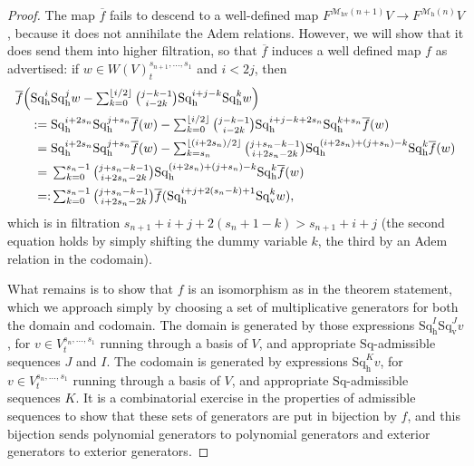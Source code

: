 \documentclass[11pt]{amsart} \renewcommand{\baselinestretch}{1.2}
\theoremstyle{plain}
\theoremstyle{definition}
\renewcommand{\to}{\longrightarrow}
\newcommand{\calMh}{\mathcal{M}\dhor}
\newcommand{\calMhv}{\mathcal{M}_\mathrm{hv}}
\newcommand{\Sq}{\mathrm{Sq}}
\newcommand{\dver}{_\mathrm{v}}
\newcommand{\dhor}{_\mathrm{h}}
\newcommand{\Sqh}{\mathrm{Sq}\dhor}
\newcommand{\Sqv}{\mathrm{Sq}\dver}
\begin{document}
\begin{Cohomology Operations for W and U}
\begin{proof}
The map $\overline{f}$ fails to descend to a well-defined map  $F^{\calMhv(n+1)}V\to F^{\calMh(n)}V$, because it does not annihilate the Adem relations. However, we will show that it does send them into higher filtration, so that $\overline{f}$ induces a well defined map $f$ as advertised: if $w\in W(V)^{s_{n+1},\ldots,s_1}_t$ and $i<2j$, then
\begin{alignat*}{2}
\overline{f}\Bigl(\Sqh^i&\Sqh^jw-\textstyle\sum_{k=0}^{\lfloor i/2\rfloor}{j-k-1\choose i-2k}\Sqh^{i+j-k}\Sqh^{k}w\Bigr)\\
{}:={}&\Sqh^{i+2s_n}\Sqh^{j+s_n}\overline{f}(w)-\textstyle\sum_{k=0}^{\lfloor i/2\rfloor}{j-k-1\choose i-2k}\Sqh^{i+j-k+2s_n}\Sqh^{k+s_n}\overline{f}(w)\\
{}={}&
\Sqh^{i+2s_n}\Sqh^{j+s_n}\overline{f}(w)-\textstyle\sum_{k=s_n}^{\lfloor (i+2s_n)/2\rfloor}{j+s_n-k-1\choose i+2s_n-2k}\Sqh^{(i+2s_n)+(j+s_n)-k}\Sqh^{k}\overline{f}(w)\\
{}={}&\textstyle\sum_{k=0}^{s_n-1}{j+s_n-k-1\choose i+2s_n-2k}\Sqh^{(i+2s_n)+(j+s_n)-k}\Sqh^{k}\overline{f}(w)\\
{}=\makebox[0cm][r]{$:$}{}&\textstyle\sum_{k=0}^{s_n-1}{j+s_n-k-1\choose i+2s_n-2k}\overline{f}(\Sqh^{i+j+2(s_n-k)+1}\Sqv^{k}w),
\end{alignat*}
which is in filtration $s_{n+1}+i+j+2(s_n+1-k)>s_{n+1}+i+j$ (the second equation holds by simply shifting the dummy variable $k$, the third by an Adem relation in the codomain).

What remains is to show that $f$ is an isomorphism as in the theorem statement, which we approach simply by choosing a set of multiplicative generators for both the domain and codomain. The domain is generated by those expressions $\Sqh^I\Sqv^Jv$, for $v\in V^{s_{n},\ldots,s_1}_t$ running through a basis of $V$, and appropriate $\Sq$-admissible sequences $J$ and $I$. The codomain is generated by expressions $\Sqh^Kv$, for $v\in V^{s_{n},\ldots,s_1}_t$ running through a basis of $V$, and appropriate $\Sq$-admissible sequences $K$. It is a  combinatorial  exercise in the properties of admissible sequences to show that these sets of generators are put in bijection by $f$, and this bijection sends polynomial generators to polynomial generators and exterior generators to exterior generators.
\end{proof}
\end{Cohomology Operations for W and U}
\end{document}
